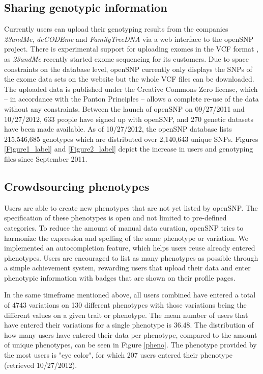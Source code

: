 \documentclass[10pt]{article}
\begin{document}
\subsection*{Sharing genotypic information}
Currently users can upload their genotyping results from the companies \textit{23andMe}, \textit{deCODEme} and \textit{FamilyTreeDNA} via a web interface to the openSNP 
project. There is experimental support for uploading exomes in the VCF format \cite{Danecek01082011}, as \textit{23andMe} recently started exome sequencing for its customers. Due to space constraints on the database level, openSNP currently only displays the SNPs of the exome data sets on the website but the whole VCF files can be downloaded.
The uploaded data is published under the Creative Commons Zero license, 
which -- in accordance with the Panton Principles \cite{10.1371/journal.pbio.1001195} -- 
allows a complete re-use of the data without any constraints.
Between the launch of openSNP on 09/27/2011 and 10/27/2012, 633 people have signed 
up with openSNP, and 270 genetic datasets have been made available. As of 10/27/2012, the openSNP database lists 215,546,685 genotypes which are distributed over 2,140,643 unique SNPs.
Figures \ref{Figure1_label} and \ref{Figure2_label} depict the increase in users and genotyping files since September 2011.


\subsection*{Crowdsourcing phenotypes}
Users are able to create new phenotypes that are not yet 
listed by openSNP. 
The specification of these phenotypes is open and not limited 
to pre-defined categories. To reduce the amount of manual data curation, openSNP tries to harmonize 
the expression and spelling of the same phenotype or variation. We implemented an 
autocompletion feature, which helps users reuse already entered phenotypes.
Users are encouraged to list as many phenotypes as possible through a simple 
achievement system, rewarding users that upload their data and enter phenotypic 
information with badges that are shown on their profile pages.

In the same timeframe mentioned above, all users combined have 
entered a total of 4743 variations on 130 different phenotypes with those variations being 
the different values on a given trait or phenotype. The mean number of users that have entered their variations for a single phenotype 
is 36.48. The distribution of how many users have 
entered their data per phenotype, compared to the amount of unique phenotypes, can be seen in Figure \ref{pheno}. The phenotype provided by the most users is "eye color", for which 207 users entered their phenotype (retrieved 10/27/2012). 
\end{document}
